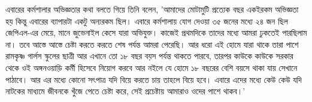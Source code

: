 \documentclass{article}
\begin{document}
\begin{minipage}[t]{102mm}
\begin{multicols}{2}
এবারের কর্মশালার অভিজ্ঞতার কথা বলতে গিয়ে তিনি বলেন, 'আমাদের মোটামুটি প্রত্যেক বছর একইরকম অভিজ্ঞতা হয় কিন্তু এবারের ব্যাপারটা একটু অন্যরকম ছিল। এবারে কর্মশালায় যোগ দেওয়া ৩৫ জনের মধ্যে ২৪ জন ছিল জেপিএল-এর মেয়ে, মানে জুভেনাইল কেসে যারা অভিযুক্ত। কাজেই প্রথমদিকে তাদের মধ্যে আমরা ঢুকতেই  পারছিলাম না। তবে আস্তে আস্তে চেষ্টা করতে করতে শেষ পর্যন্ত আমরা পেরেছি। আর ধরো এই হোমে যারা থাকে তারা পাশে রামকৃষ্ণ গার্লস স্কুলের ছাত্রী আর এখানে তো ১৮ বছর বয়স পর্যন্ত থাকতে পারবে, তারপর কাউকে কাউকে সরকার থেকে ওই অঙ্গনওয়াড়ি কর্মী হিসেবে নিয়োগ করবে আর নইলে যে হোমে ১৮ বছরের বেশি বয়সে থাকা যায় সেখানে পাঠাবে। আর এর মধ্যে কোনো সৎপাত্র যদি বিয়ে করতে চায় তাহলে বিয়ে হবে। এবারে এদের মধ্যে কেউ কেউ যদি নাটকের মাধ্যমে জীবনকে খুঁজে পেতে চেষ্টা করে, সেই প্রচেষ্টায় আমারাও ওদের পাশে থাকব।' 
\end{multicols}
\end{minipage}
\end{document}
